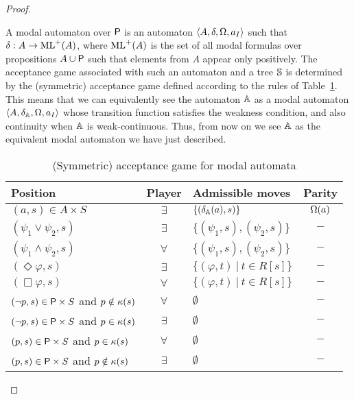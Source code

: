 \begin{proof}
\begin{pfclaim}
A modal automaton over $\mathsf{P}$ is an automaton $ \langle{A, \delta, \Omega, a_I}\rangle$ such that $\delta : A \to \mathrm{ML}^+ (A)$, where $\mathrm{ML}^+ (A)$ is the set of all modal formulas over propositions $A \cup \mathsf{P}$ such that elements from $A$ appear only positively.
The acceptance game associated with such an automaton and a tree $\mathbb{S}$ is determined by the (symmetric) acceptance game defined according to the rules of Table~\ref{symmetric_modal_game}.
This means that we can equivalently see the automaton $\mathbb{A}$ as a modal automaton $\langle{A, \delta_\ensuremath\mathbb{A}, \Omega, a_I}\rangle$ whose transition function satisfies the weakness condition, and also continuity when $\mathbb{A}$ is weak-continuous. Thus, from now on we see $\mathbb{A}$ as the equivalent modal automaton we have just described.

\begin{table}[h]
  \centering
\begin{tabular}{|l|c|l|c|}
 \hline
  Position & Player & Admissible moves & Parity\\
   \hline
  $(a,s) \in A \times S$ & $\exists$ & $\{(\delta_\mathbb{A}(a),s)\}$ & $\Omega(a)$\\
  $(\psi_1 \vee \psi_2,s)$ & $\exists$ & $\{(\psi_1,s),(\psi_2,s) \}$ & $-$ \\
  $(\psi_1 \wedge \psi_2,s)$ & $\forall$ & $\{(\psi_1,s),(\psi_2,s) \}$ & $-$ \\
  $(\Diamond\varphi,s)$ & $\exists$ & $\{(\varphi,t)\ |\ t \in R[s] \}$ & $-$ \\
  $(\Box\varphi,s)$ & $\forall$ & $\{(\varphi,t)\ |\ t \in R[s] \}$ & $-$ \\
  $(\lnot p,s) \in \mathsf{P} \times S$ and $p \notin \kappa(s)$ & $\forall$ & $\emptyset$ & $-$\\
  $(\lnot p,s) \in \mathsf{P} \times S$ and $p \in \kappa(s)$ & $\exists$ & $\emptyset$ & $-$\\
  $(p,s) \in \mathsf{P} \times S$ and $p \in \kappa(s)$ & $\forall$ & $\emptyset$ & $-$\\
  $(p,s) \in \mathsf{P} \times S$ and $p \notin \kappa(s)$ & $\exists$ & $\emptyset$ & $-$\\

  \hline
\end{tabular}
 \caption{(Symmetric) acceptance game for modal automata}
 \label{symmetric_modal_game}
\end{table}






\end{pfclaim}
\end{proof}
